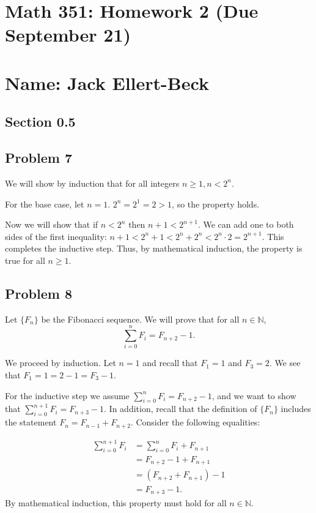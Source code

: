 \documentclass[11pt]{article}
\newcommand{\N}{\mathbb{N}}
\begin{document}
\setlength{\parindent}{0pt}
\setlength{\parskip}{9pt}


\section*{Math 351: Homework 2 (Due September 21)}
\section*{Name: Jack Ellert-Beck}

\bigskip

\subsection*{Section 0.5}
\subsection*{Problem 7}

We will show by induction that for all integers $n \geq 1, n < 2^n$.

For the base case, let $n=1$. $2^n = 2^1 = 2 > 1$, so the property holds.

Now we will show that if $n < 2^n$ then $n+1 < 2^{n+1}$. We can add one to both sides
of the first inequality: 
$n+1 < 2^n + 1 < 2^n + 2^n < 2^n\cdot 2 = 2^{n+1}$. This completes the inductive step.
Thus, by mathematical induction, the property is true for all $n \geq 1$.

\subsection*{Problem 8}

Let $\{F_n\}$ be the Fibonacci sequence. We will prove that for all $n \in \N$,
\[ \sum^n_{i=0}F_i = F_{n+2}-1. \]

We proceed by induction. Let $n=1$ and recall that $F_1=1$ and $F_3=2$.
We see that $F_1 = 1 = 2 - 1 = F_3-1$.

For the inductive step we assume $ \sum^n_{i=0}F_i = F_{n+2}-1 $, and we want
to show that $ \sum^{n+1}_{i=0}F_i = F_{n+3}-1 $. In addition,
recall that the definition of $\{F_n\}$ includes the statement 
$F_n = F_{n-1} + F_{n+2}$. Consider the following equalities:

\[
\begin{array}{rl}
\sum^{n+1}_{i=0}F_i &= \sum^n_{i=0}F_i + F_{n+1} \\
&= F_{n+2} - 1 + F_{n+1} \\
&= (F_{n+2} + F_{n+1}) - 1 \\
&= F_{n+3} - 1.
\end{array}
\]
By mathematical induction, this property must hold for all $n \in \N$.
\end{document}
